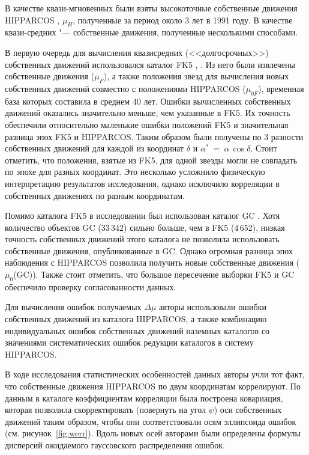В качестве квази-мгновенных были взяты высокоточные собственные движения HIPPARCOS \cite{1997ESASP1200.....E}, $\mu_{H}$, полученные за период около 3 лет в 1991 году. В качестве квази-средних "--- собственные движения, полученные несколькими способами. 

В первую очередь для вычисления квазисредних (<<долгосрочных>>) собственных движений использовался каталог FK5 \cite{1988VeARI..32....1F}, \cite{1991VeARI..33....1F}. Из него были извлечены собственные движения ($\mu_F$), а также положения звезд для вычисления новых собственных движений совместно с положениями HIPPARCOS ($\mu_{0F}$), временная база которых составила в среднем 40 лет. Ошибки вычисленных собственных движений оказались значительно меньше, чем указанные в FK5. Их точность обеспечили относительно маленькие ошибки положений FK5 и значительная разница эпох FK5 и HIPPARCOS. Таким образом были получены по 3 разности собственных движений для каждой из координат $\delta$  и $\alpha ^*$~=~$\alpha\,\cos\delta$. Стоит отметить, что положения, взятые из FK5, для одной звезды могли не совпадать по эпохе для разных координат. Это несколько усложнило физическую интерпретацию результатов исследования, однако исключило корреляции в собственных движениях по разным координатам.

Помимо каталога FK5 в исследовании был использован каталог GC \cite{1936gcts.book.....B}. Хотя количество объектов GC (33\,342) сильно больше, чем в FK5 (4\,652), низкая точность собственных движений этого каталога не позволила использовать собственные движения, опубликованные в GC. Однако огромная разница эпох наблюдения с HIPPARCOS позволила получить новые собственные движения ($\mu_{0}$(GC)). Также стоит отметить, что большое пересечение выборки FK5 и GC обеспечило проверку согласованности данных.

Для вычисления ошибок получаемых $\Delta\mu$ авторы использовали ошибки собственных движений из каталога HIPPARCOS, а также комбинацию индивидуальных ошибок собственных движений наземных каталогов со значениями систематических ошибок редукции каталогов в систему HIPPARCOS.

В ходе исследования статистических особенностей данных авторы учли тот факт, что собственные движения HIPPARCOS по двум координатам коррелируют. По данным в каталоге коэффициентам корреляции была построена ковариация, которая позволила скорректировать (повернуть на угол $\psi$) оси собственных движений таким образом, чтобы они соответствовали осям эллипсоида ошибок (см. рисунок~\ref{fig:werr}). Вдоль новых осей авторами были определены формулы дисперсий ожидаемого гауссовского распределения ошибок.

